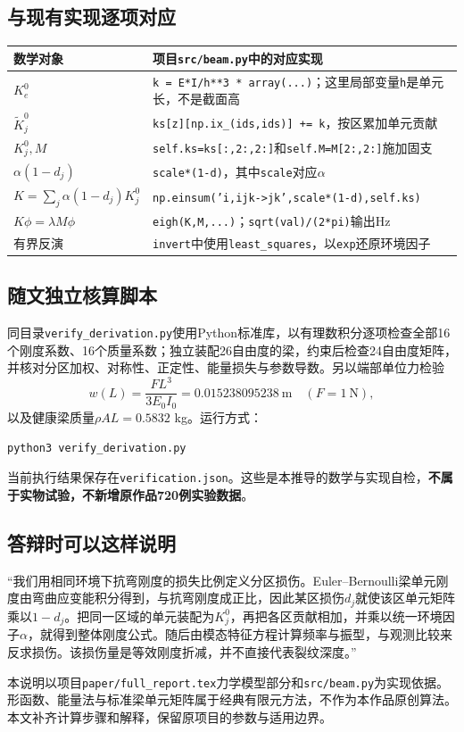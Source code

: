 \documentclass[UTF8,a4paper,11pt,fontset=fandol]{ctexart}
\numberwithin{equation}{section}
\begin{document}
\subsection{与现有实现逐项对应}
\begin{center}\small
\begin{tabular}{p{38mm}p{100mm}}\toprule
数学对象 & 项目\texttt{src/beam.py}中的对应实现\\\midrule
$K_e^0$ & \texttt{k = E*I/h**3 * array(...)}；这里局部变量\texttt{h}是单元长，不是截面高\\
$\widetilde K_j^0$ & \texttt{ks[z][np.ix\_(ids,ids)] += k}，按区累加单元贡献\\
$K_j^0,M$ & \texttt{self.ks=ks[:,2:,2:]}和\texttt{self.M=M[2:,2:]}施加固支\\
$\alpha(1-d_j)$ & \texttt{scale*(1-d)}，其中\texttt{scale}对应$\alpha$\\
$K=\sum_j\alpha(1-d_j)K_j^0$ & \texttt{np.einsum('i,ijk->jk',scale*(1-d),self.ks)}\\
$K\phi=\lambda M\phi$ & \texttt{eigh(K,M,...)}；\texttt{sqrt(val)/(2*pi)}输出Hz\\
有界反演 & \texttt{invert}中使用\texttt{least\_squares}，以\texttt{exp}还原环境因子\\\bottomrule
\end{tabular}\end{center}
\subsection{随文独立核算脚本}
同目录\texttt{verify\_derivation.py}使用Python标准库，以有理数积分逐项检查全部16个刚度系数、16个质量系数；独立装配26自由度的梁，约束后检查24自由度矩阵，并核对分区加权、对称性、正定性、能量损失与参数导数。另以端部单位力检验
\begin{equation}
w(L)=\frac{FL^3}{3E_0I_0}
=0.015238095238\ \mathrm m\quad(F=1\ \mathrm N),
\end{equation}
以及健康梁质量$\rho AL=0.5832$ kg。运行方式：
\begin{lstlisting}
python3 verify_derivation.py
\end{lstlisting}
当前执行结果保存在\texttt{verification.json}。这些是本推导的数学与实现自检，\textbf{不属于实物试验，不新增原作品720例实验数据}。
\subsection{答辩时可以这样说明}
“我们用相同环境下抗弯刚度的损失比例定义分区损伤。Euler--Bernoulli梁单元刚度由弯曲应变能积分得到，与抗弯刚度成正比，因此某区损伤$d_j$就使该区单元矩阵乘以$1-d_j$。把同一区域的单元装配为$K_j^0$，再把各区贡献相加，并乘以统一环境因子$\alpha$，就得到整体刚度公式。随后由模态特征方程计算频率与振型，与观测比较来反求损伤。该损伤量是等效刚度折减，并不直接代表裂纹深度。”

本说明以项目\texttt{paper/full\_report.tex}力学模型部分和\texttt{src/beam.py}为实现依据。形函数、能量法与标准梁单元矩阵属于经典有限元方法，不作为本作品原创算法。本文补齐计算步骤和解释，保留原项目的参数与适用边界。
\end{document}
